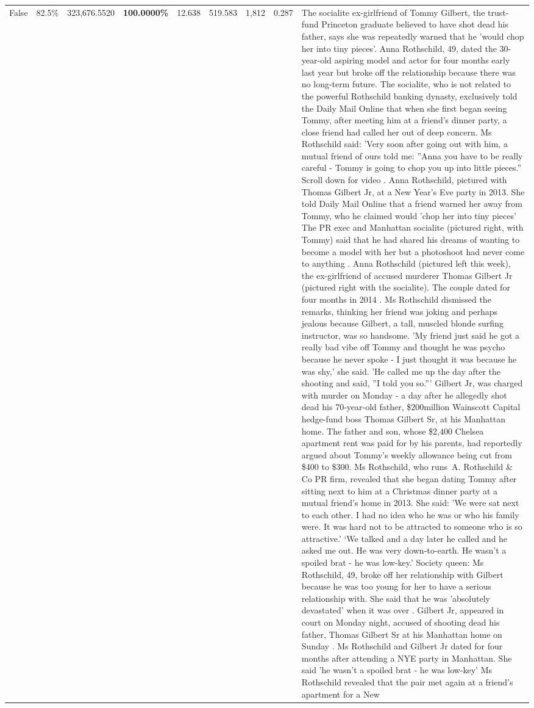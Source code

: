 \begin{table}[H]
\begin{tabular}{lllrlllll}
False & 82.5\% & 323,676.5520 & \bfseries \color{red} 100.0000\% & 12.638 & 519.583 & 1,812 & 0.287 & The socialite ex-girlfriend of Tommy Gilbert, the trust-fund Princeton graduate believed to have shot dead his father, says she was repeatedly warned that he 'would chop her into tiny pieces'. Anna Rothschild, 49, dated the 30-year-old aspiring model and actor for four months early last year but broke off the relationship because there was no long-term future. The socialite, who is not related to the powerful Rothschild banking dynasty, exclusively told the Daily Mail Online that when she first began seeing Tommy, after meeting him at a friend's dinner party, a close friend had called her out of deep concern. Ms Rothschild said: 'Very soon after going out with him, a mutual friend of ours told me: ''Anna you have to be really careful - Tommy is going to chop you up into little pieces.'' Scroll down for video . Anna Rothschild, pictured with Thomas Gilbert Jr, at a New Year's Eve party in 2013. She told Daily Mail Online that a friend warned her away from Tommy, who he claimed would 'chop her into tiny pieces' The PR exec and Manhattan socialite (pictured right, with Tommy) said that he had shared his dreams of wanting to become a model with her but a photoshoot had never come to anything . Anna Rothschild (pictured left this week), the ex-girlfriend of accused murderer Thomas Gilbert Jr (pictured right with the socialite). The couple dated for four months in 2014 . Ms Rothschild dismissed the remarks, thinking her friend was joking and perhaps jealous because Gilbert, a tall, muscled blonde surfing instructor, was so handsome. 'My friend just said he got a really bad vibe off Tommy and thought he was psycho because he never spoke - I just thought it was because he was shy,' she said. 'He called me up the day after the shooting and said, ''I told you so.''' Gilbert Jr, was charged with murder on Monday - a day after he allegedly shot dead his 70-year-old father, \$200million Wainscott Capital hedge-fund boss Thomas Gilbert Sr, at his Manhattan home. The father and son, whose \$2,400 Chelsea apartment rent was paid for by his parents, had reportedly argued about Tommy's weekly allowance being cut from \$400 to \$300. Ms Rothschild, who runs A. Rothschild \& Co PR firm, revealed that she began dating Tommy after sitting next to him at a Christmas dinner party at a mutual friend's home in 2013. She said: 'We were sat next to each other. I had no idea who he was or who his family were. It was hard not to be attracted to someone who is so attractive.' ‘We talked and a day later he called and he asked me out. He was very down-to-earth. He wasn’t a spoiled brat - he was low-key.’ Society queen: Ms Rothschild, 49, broke off her relationship with Gilbert because he was too young for her to have a serious relationship with. She said that he was 'absolutely devastated' when it was over . Gilbert Jr, appeared in court on Monday night, accused of shooting dead his father, Thomas Gilbert Sr at his Manhattan home on Sunday . Ms Rothschild and Gilbert Jr dated for four months after attending a NYE party in Manhattan. She said 'he wasn't a spoiled brat - he was low-key' Ms Rothschild revealed that the pair met again at a friend’s apartment for a New 
\end{tabular}
\end{table}
